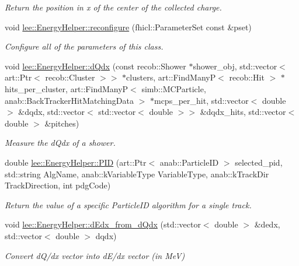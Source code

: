 \begin{DoxyCompactItemize}
\begin{DoxyCompactList}\small\item\em Return the position in x of the center of the collected charge. \end{DoxyCompactList}\item 
void \hyperlink{group__lee_ga4523185d78d6b7aa94dbf26475750282}{lee\-::\-Energy\-Helper\-::reconfigure} (fhicl\-::\-Parameter\-Set const \&pset)
\begin{DoxyCompactList}\small\item\em Configure all of the parameters of this class. \end{DoxyCompactList}\item 
void \hyperlink{group__lee_ga7ccbc2f2f2b594291e89f29c8e4616a7}{lee\-::\-Energy\-Helper\-::d\-Qdx} (const recob\-::\-Shower $\ast$shower\-\_\-obj, std\-::vector$<$ art\-::\-Ptr$<$ recob\-::\-Cluster $>$$>$ $\ast$clusters, art\-::\-Find\-Many\-P$<$ recob\-::\-Hit $>$ $\ast$hits\-\_\-per\-\_\-cluster, art\-::\-Find\-Many\-P$<$ simb\-::\-M\-C\-Particle, anab\-::\-Back\-Tracker\-Hit\-Matching\-Data $>$ $\ast$mcps\-\_\-per\-\_\-hit, std\-::vector$<$ double $>$ \&dqdx, std\-::vector$<$ std\-::vector$<$ double $>$$>$ \&dqdx\-\_\-hits, std\-::vector$<$ double $>$ \&pitches)
\begin{DoxyCompactList}\small\item\em Measure the d\-Qdx of a shower. \end{DoxyCompactList}\item 
double \hyperlink{group__lee_gab3e573f8d2d733f94b8ca862d7343864}{lee\-::\-Energy\-Helper\-::\-P\-I\-D} (art\-::\-Ptr$<$ anab\-::\-Particle\-I\-D $>$ selected\-\_\-pid, std\-::string Alg\-Name, anab\-::k\-Variable\-Type Variable\-Type, anab\-::k\-Track\-Dir Track\-Direction, int pdg\-Code)
\begin{DoxyCompactList}\small\item\em Return the value of a specific Particle\-I\-D algorithm for a single track. \end{DoxyCompactList}\item 
void \hyperlink{group__lee_ga2844c7f27f79fbe5e16d9c674ca4afa1}{lee\-::\-Energy\-Helper\-::d\-Edx\-\_\-from\-\_\-d\-Qdx} (std\-::vector$<$ double $>$ \&dedx, std\-::vector$<$ double $>$ dqdx)
\begin{DoxyCompactList}\small\item\em Convert d\-Q/dx vector into d\-E/dx vector (in Me\-V) \end{DoxyCompactList}\item 

\end{DoxyCompactItemize}
